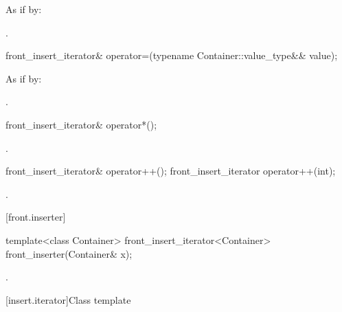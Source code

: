 \begin{itemdescr}
\pnum
\effects
As if by: 

\pnum
\returns
{}.
\end{itemdescr}

%
\begin{itemdecl}
front_insert_iterator& operator=(typename Container::value_type&& value);
\end{itemdecl}

\begin{itemdescr}
\pnum
\effects
As if by: 

\pnum
\returns
{}.
\end{itemdescr}

%
\begin{itemdecl}
front_insert_iterator& operator*();
\end{itemdecl}

\begin{itemdescr}
\pnum
\returns
{}.
\end{itemdescr}

%
\begin{itemdecl}
front_insert_iterator& operator++();
front_insert_iterator  operator++(int);
\end{itemdecl}

\begin{itemdescr}
\pnum
\returns
{}.
\end{itemdescr}

[front.inserter]{}

%
\begin{itemdecl}
template<class Container>
  front_insert_iterator<Container> front_inserter(Container& x);
\end{itemdecl}

\begin{itemdescr}
\pnum
\returns
{}.
\end{itemdescr}

[insert.iterator]{Class template }

